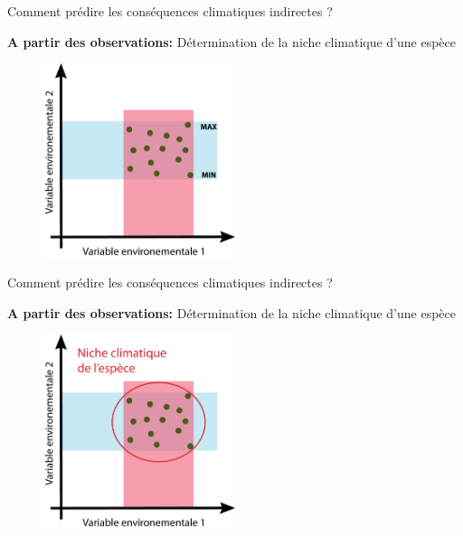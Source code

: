 \documentclass{eecslides}
\begin{document}
	\begin{frame}[t]{Comment prédire les conséquences climatiques indirectes ?}

		\textbf{A partir des observations:} Détermination de la niche climatique d'une espèce

		\begin{figure}
			\vspace{-0.5cm}
			\includegraphics[width=0.5\textwidth]{Niche2.png} 
		\end{figure}    
	
	\end{frame}

	\begin{frame}[t]{Comment prédire les conséquences climatiques indirectes ?}

		\textbf{A partir des observations:} Détermination de la niche climatique d'une espèce

		\begin{figure}
			\vspace{-0.5cm}
			\includegraphics[width=0.5\textwidth]{Niche3.png} 
		\end{figure}    
	
	\end{frame}
\end{document}

